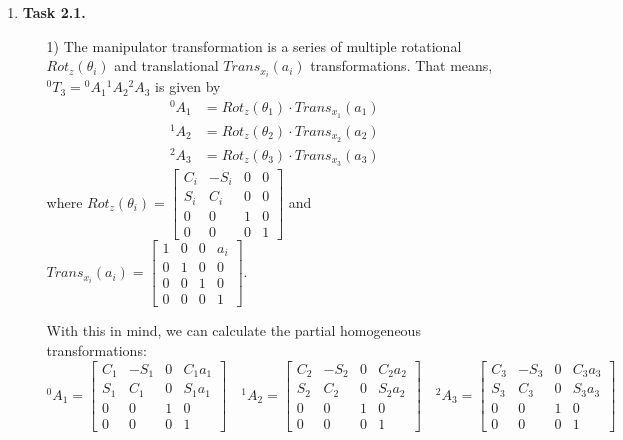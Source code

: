 \documentclass[a4paper,11pt]{article}
\author{\authorinfo}
\title{\titleinfo}
\date{\today}
\begin{document}
\maketitle
\begin {enumerate}
\item[\textbf{Task 2.1.}]

    \begin{enumerate}
        \item[1)] The manipulator transformation is a series of multiple rotational $Rot_z(\theta_i)$ and translational $Trans_{x_i}(a_i)$ transformations. That means, $^0T_3 = {^0A_1} {^1A_2} {^2A_3}$ is given by
        	\begin{align*}
        		^0A_1 &= Rot_z(\theta_1) \cdot Trans_{x_1}(a_1)\\
        		^1A_2 &= Rot_z(\theta_2) \cdot Trans_{x_2}(a_2)\\
        		^2A_3 &= Rot_z(\theta_3) \cdot Trans_{x_3}(a_3)
        	\end{align*}
        	where $Rot_z(\theta_i) = \begin{bmatrix}
        		C_i & -S_i & 0 & 0\\
        		S_i & C_i & 0 & 0\\
        		0 & 0 & 1 & 0\\
        		0 & 0 & 0 & 1
        	\end{bmatrix}$
        	and
        	$Trans_{x_i}(a_i) = \begin{bmatrix}
        		1 & 0 & 0 & a_i\\
        		0 & 1 & 0 & 0\\
        		0 & 0 & 1 & 0\\
        		0 & 0 & 0 & 1
        	\end{bmatrix}$.
        	
        	With this in mind, we can calculate the partial homogeneous transformations:
	        	$${^0A_1} = \begin{bmatrix} C_1 & -S_1 & 0 & C_1a_1\\ S_1 & C_1 & 0 & S_1a_1\\ 0 & 0 & 1 & 0\\ 0 & 0 & 0 & 1 \end{bmatrix} \quad
	        	{^1A_2} = \begin{bmatrix} C_2 & -S_2 & 0 & C_2a_2\\ S_2 & C_2 & 0 & S_2a_2\\ 0 & 0 & 1 & 0\\ 0 & 0 & 0 & 1 \end{bmatrix}\quad
	        	{^2A_3} = \begin{bmatrix} C_3 & -S_3 & 0 & C_3a_3\\ S_3 & C_3 & 0 & S_3a_3\\ 0 & 0 & 1 & 0\\ 0 & 0 & 0 & 1 \end{bmatrix}$$
   

\end{enumerate}
\end{enumerate}
\end{document}
